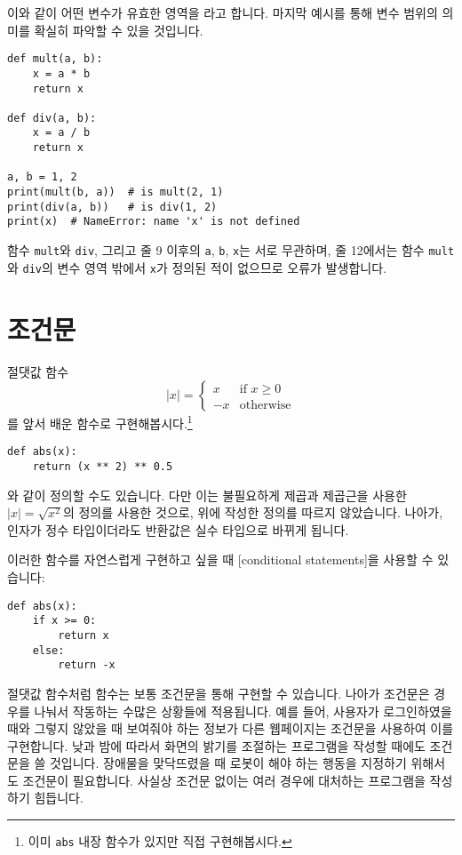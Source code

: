 \documentclass[../main.tex]{subfiles}
\begin{document}
이와 같이 어떤 변수가 유효한 영역을 라고 합니다.
마지막 예시를 통해 변수 범위의 의미를 확실히 파악할 수 있을 것입니다.
\begin{verbatim}
def mult(a, b):
    x = a * b
    return x

def div(a, b):
    x = a / b
    return x

a, b = 1, 2
print(mult(b, a))  # is mult(2, 1)
print(div(a, b))   # is div(1, 2)
print(x)  # NameError: name 'x' is not defined
\end{verbatim}
함수 \texttt{mult}와 \texttt{div}, 그리고 줄 9 이후의 \texttt{a}, \texttt{b}, \texttt{x}는 서로 무관하며, 줄 12에서는 함수 \texttt{mult}와 \texttt{div}의 변수 영역 밖에서 \texttt{x}가 정의된 적이 없으므로 오류가 발생합니다.

\section{조건문}
절댓값 함수
\[
|x| = \begin{cases}
x & \text{if $x \geq 0$}\\
-x & \text{otherwise}
\end{cases}
\]
를 앞서 배운 함수로 구현해봅시다.\footnote{이미 \texttt{abs} 내장 함수가 있지만 직접 구현해봅시다.}
\begin{verbatim}
def abs(x):
    return (x ** 2) ** 0.5
\end{verbatim}
와 같이 정의할 수도 있습니다.
다만 이는 불필요하게 제곱과 제곱근을 사용한 $|x| = \sqrt{x^2}$의 정의를 사용한 것으로, 위에 작성한 정의를 따르지 않았습니다.
나아가, 인자가 정수 타입이더라도 반환값은 실수 타입으로 바뀌게 됩니다.

이러한 함수를 자연스럽게 구현하고 싶을 때 [conditional statements]을 사용할 수 있습니다:
\begin{verbatim}
def abs(x):
    if x >= 0:
        return x
    else:
        return -x
\end{verbatim}

절댓값 함수처럼  함수는 보통 조건문을 통해 구현할 수 있습니다.
나아가 조건문은 경우를 나눠서 작동하는 수많은 상황들에 적용됩니다.
예를 들어, 사용자가 로그인하였을 때와 그렇지 않았을 때 보여줘야 하는 정보가 다른 웹페이지는 조건문을 사용하여 이를 구현합니다.
낮과 밤에 따라서 화면의 밝기를 조절하는 프로그램을 작성할 때에도 조건문을 쓸 것입니다.
장애물을 맞닥뜨렸을 때 로봇이 해야 하는 행동을 지정하기 위해서도 조건문이 필요합니다.
사실상 조건문 없이는 여러 경우에 대처하는 프로그램을 작성하기 힘듭니다.
\end{document}
